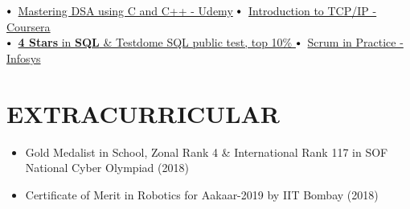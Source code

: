 \documentclass[letterpaper,11pt]{article}
\newcommand{\resumeItem}[1]{
  \item\small{
    {#1 \vspace{-2pt}}
  }
}
\newcommand{\resumeItemListStart}{\begin{itemize}}
\newcommand{\resumeItemListEnd}{\end{itemize}\vspace{-5pt}}
\newcommand\sbullet[1][.5]{\mathbin{\vcenter{\hbox{\scalebox{#1}{$\bullet$}}}}}
\begin{document}
$\sbullet[.75] \hspace{0.2cm}${\href{certificateLink.com}{Mastering DSA using C and C++ - Udemy}}{\hspace{2.59cm}}
$\sbullet[.75] \hspace{0.2cm}${\href{https://coursera.org/share/a656928badb013f8349adde2fd04db2e}{Introduction to TCP/IP - Coursera \faExternalLink}} \\

$\sbullet[.75] \hspace{0.2cm}${\href{https://www.hackerrank.com/s_rohatgi}{\textbf{4 Stars} in \textbf{SQL} \& {Testdome SQL public test, top 10\%
}}}\hspace{.43cm}
$\sbullet[.75] \hspace{0.2cm}${\href{https://infyspringboard.onwingspan.com/en/cert/0b59373e-7378-406a-94b4-d8efcd53d044}{Scrum in Practice - Infosys \faExternalLink}} \\

 \section{EXTRACURRICULAR}
    \resumeItemListStart
    \vspace{2pt}
        \resumeItem{
        {\normalsize{Gold Medalist in School, Zonal Rank 4 \& International Rank 117 in SOF National Cyber Olympiad (2018)}
        }}
         \resumeItem{
        {\normalsize{Certificate of Merit in Robotics for Aakaar-2019 by IIT Bombay (2018)}
        }}
    \resumeItemListEnd
\end{document}
